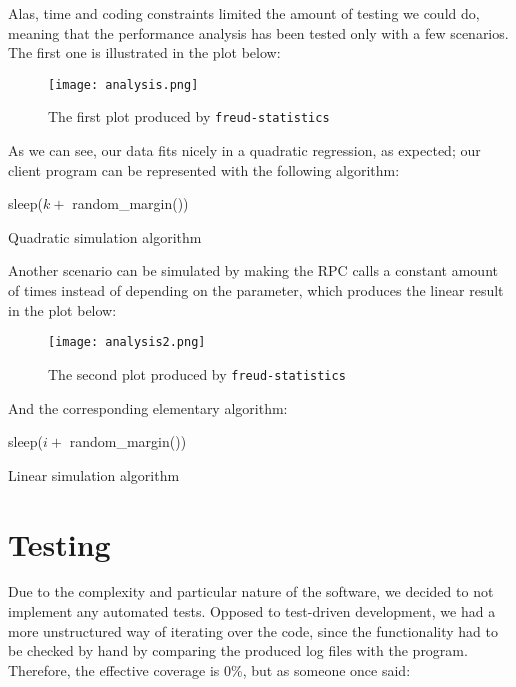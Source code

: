\documentclass[11pt,english,singlespacing,headsepline,consistentlayout]{auxiliary/si-msc-thesis}
\begin{document}
    Alas, time and coding constraints limited the amount of testing we
could do, meaning that the performance analysis has been tested only
with a few scenarios. The first one is illustrated in the plot below:

\begin{figure}[H] \centering
  \texttt{[image: analysis.png]}
  \caption{The first plot produced by \texttt{freud-statistics}}
  \label{fig:analysis1}
\end{figure}

As we can see, our data fits nicely in a quadratic regression, as
expected; our client program can be represented with the following
algorithm:

\begin{algorithm}[H]  {
     {  { sleep($k + $ random\_margin())\; } } }
  \caption{Quadratic simulation algorithm}
\end{algorithm}

\vspace{5mm}

Another scenario can be simulated by making the RPC calls a constant
amount of times instead of depending on the parameter, which produces
the linear result in the plot below:

\begin{figure}[H] \centering
  \texttt{[image: analysis2.png]}
  \caption{The second plot produced by
    \texttt{freud-statistics}}
  \label{fig:analysis2}
\end{figure}

And the corresponding elementary algorithm:

\begin{algorithm}[H] \SetAlgoLined {} {  { sleep($i + $
      random\_margin())\; } }
  \caption{Linear simulation algorithm}
\end{algorithm}

\vspace{5mm}


\section{Testing}

Due to the complexity and particular nature of the software,
we decided to not implement any automated tests. Opposed to
test-driven development, we had a more unstructured way of iterating
over the code, since the functionality had to be checked by hand by
comparing the produced log files with the program.  Therefore, the
effective coverage is 0\%, but as someone once said:
\end{document}
